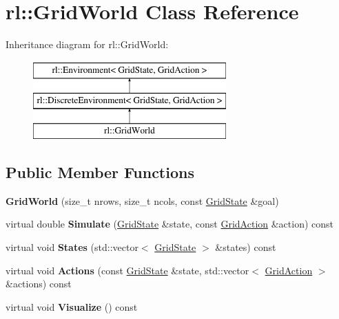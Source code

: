 \hypertarget{classrl_1_1_grid_world}{}\section{rl\+:\+:Grid\+World Class Reference}
\label{classrl_1_1_grid_world}
Inheritance diagram for rl\+:\+:Grid\+World\+:\begin{figure}[H]
\begin{center}
\leavevmode
\includegraphics[height=3.000000cm]{classrl_1_1_grid_world}
\end{center}
\end{figure}
\subsection*{Public Member Functions}
\begin{DoxyCompactItemize}
\item 
\hypertarget{classrl_1_1_grid_world_a5b67dffbc875e7c3bbc0ad777fd3f4bf}{}\label{classrl_1_1_grid_world_a5b67dffbc875e7c3bbc0ad777fd3f4bf} 
{\bfseries Grid\+World} (size\+\_\+t nrows, size\+\_\+t ncols, const \hyperlink{structrl_1_1_grid_state}{Grid\+State} \&goal)
\item 
\hypertarget{classrl_1_1_grid_world_a158de44c9973c96999db6984ff32142c}{}\label{classrl_1_1_grid_world_a158de44c9973c96999db6984ff32142c} 
virtual double {\bfseries Simulate} (\hyperlink{structrl_1_1_grid_state}{Grid\+State} \&state, const \hyperlink{structrl_1_1_grid_action}{Grid\+Action} \&action) const
\item 
\hypertarget{classrl_1_1_grid_world_a7ba442cfab266d2521750383e6cea98b}{}\label{classrl_1_1_grid_world_a7ba442cfab266d2521750383e6cea98b} 
virtual void {\bfseries States} (std\+::vector$<$ \hyperlink{structrl_1_1_grid_state}{Grid\+State} $>$ \&states) const
\item 
\hypertarget{classrl_1_1_grid_world_a510ef01ace9b62b77eef272dc62f67ae}{}\label{classrl_1_1_grid_world_a510ef01ace9b62b77eef272dc62f67ae} 
virtual void {\bfseries Actions} (const \hyperlink{structrl_1_1_grid_state}{Grid\+State} \&state, std\+::vector$<$ \hyperlink{structrl_1_1_grid_action}{Grid\+Action} $>$ \&actions) const
\item 
\hypertarget{classrl_1_1_grid_world_a38e94429ceff827a645410210aded137}{}\label{classrl_1_1_grid_world_a38e94429ceff827a645410210aded137} 
virtual void {\bfseries Visualize} () const
\end{DoxyCompactItemize}
